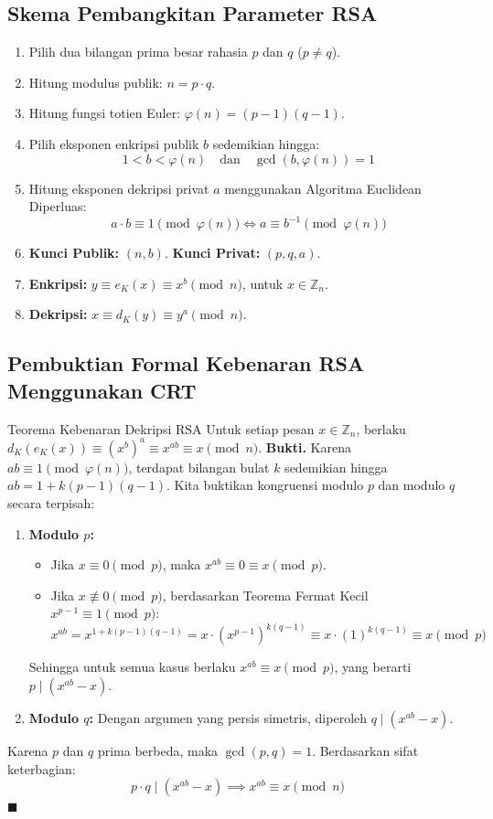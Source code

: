 \documentclass[11pt,a4paper]{article}
\newenvironment{proof}{\noindent\textbf{Bukti.}}{\hfill$\blacksquare$\vspace{0.3em}}
\begin{document}
\subsection{Skema Pembangkitan Parameter RSA}
\begin{enumerate}[leftmargin=*]
    \item Pilih dua bilangan prima besar rahasia $p$ dan $q$ ($p \neq q$).
    \item Hitung modulus publik: $n = p \cdot q$.
    \item Hitung fungsi totien Euler: $\varphi(n) = (p - 1)(q - 1)$.
    \item Pilih eksponen enkripsi publik $b$ sedemikian hingga:
    \[
    1 < b < \varphi(n) \quad \text{dan} \quad \gcd(b, \varphi(n)) = 1
    \]
    \item Hitung eksponen dekripsi privat $a$ menggunakan Algoritma Euclidean Diperluas:
    \[
    a \cdot b \equiv 1 \pmod{\varphi(n)} \iff a \equiv b^{-1} \pmod{\varphi(n)}
    \]
    \item \textbf{Kunci Publik:} $(n, b)$. \textbf{Kunci Privat:} $(p, q, a)$.
    \item \textbf{Enkripsi:} $y \equiv e_K(x) \equiv x^b \pmod n$, untuk $x \in \mathbb{Z}_n$.
    \item \textbf{Dekripsi:} $x \equiv d_K(y) \equiv y^a \pmod n$.
\end{enumerate}

\subsection{Pembuktian Formal Kebenaran RSA Menggunakan CRT}
\begin{thmbox}{Teorema Kebenaran Dekripsi RSA}
Untuk setiap pesan $x \in \mathbb{Z}_n$, berlaku $d_K(e_K(x)) \equiv (x^b)^a \equiv x^{ab} \equiv x \pmod n$.
\begin{proof}
Karena $ab \equiv 1 \pmod{\varphi(n)}$, terdapat bilangan bulat $k$ sedemikian hingga $ab = 1 + k(p - 1)(q - 1)$.
Kita buktikan kongruensi modulo $p$ dan modulo $q$ secara terpisah:
\begin{enumerate}
    \item \textbf{Modulo $p$:}
    \begin{itemize}
        \item Jika $x \equiv 0 \pmod p$, maka $x^{ab} \equiv 0 \equiv x \pmod p$.
        \item Jika $x \not\equiv 0 \pmod p$, berdasarkan Teorema Fermat Kecil $x^{p-1} \equiv 1 \pmod p$:
        \[
        x^{ab} = x^{1 + k(p-1)(q-1)} = x \cdot (x^{p-1})^{k(q-1)} \equiv x \cdot (1)^{k(q-1)} \equiv x \pmod p
        \]
    \end{itemize}
    Sehingga untuk semua kasus berlaku $x^{ab} \equiv x \pmod p$, yang berarti $p \mid (x^{ab} - x)$.
    \item \textbf{Modulo $q$:} Dengan argumen yang persis simetris, diperoleh $q \mid (x^{ab} - x)$.
\end{enumerate}
Karena $p$ dan $q$ prima berbeda, maka $\gcd(p, q) = 1$. Berdasarkan sifat keterbagian:
\[
p \cdot q \mid (x^{ab} - x) \implies x^{ab} \equiv x \pmod n
\]
\end{proof}
\end{thmbox}
\end{document}
